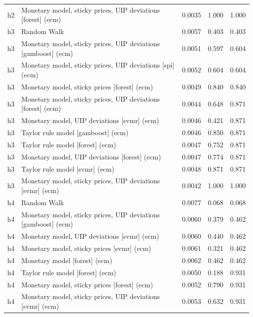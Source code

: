 \begin{ThreePartTable}
\begin{longtable}[t]{cp{5.5cm}ccc}
h2 & \raggedright Monetary model, sticky prices, UIP deviations [forest] (ecm) & 0.0035 & 1.000 & 1.000\\
\addlinespace
h3 & \raggedright Random Walk & 0.0057 & 0.403 & 0.403\\
h3 & \raggedright Monetary model, sticky prices, UIP deviations [gamboost] (ecm) & 0.0051 & 0.597 & 0.604\\
h3 & \raggedright Monetary model, sticky prices, UIP deviations [spi] (ecm) & 0.0052 & 0.604 & 0.604\\
h3 & \raggedright Monetary model, sticky prices [forest] (ecm) & 0.0049 & 0.840 & 0.840\\
h3 & \raggedright Monetary model, sticky prices, UIP deviations [forest] (ecm) & 0.0044 & 0.648 & 0.871\\
h3 & \raggedright Monetary model, UIP deviations [svmr] (ecm) & 0.0046 & 0.421 & 0.871\\
h3 & \raggedright Taylor rule model [gamboost] (ecm) & 0.0046 & 0.850 & 0.871\\
h3 & \raggedright Taylor rule model [forest] (ecm) & 0.0047 & 0.752 & 0.871\\
h3 & \raggedright Monetary model, UIP deviations [forest] (ecm) & 0.0047 & 0.774 & 0.871\\
h3 & \raggedright Taylor rule model [svmr] (ecm) & 0.0048 & 0.871 & 0.871\\
h3 & \raggedright Monetary model, sticky prices, UIP deviations [svmr] (ecm) & 0.0042 & 1.000 & 1.000\\
\addlinespace
h4 & \raggedright Random Walk & 0.0077 & 0.068 & 0.068\\
h4 & \raggedright Monetary model, sticky prices, UIP deviations [gamboost] (ecm) & 0.0060 & 0.379 & 0.462\\
h4 & \raggedright Monetary model, UIP deviations [svmr] (ecm) & 0.0060 & 0.440 & 0.462\\
h4 & \raggedright Monetary model, sticky prices [svmr] (ecm) & 0.0061 & 0.321 & 0.462\\
h4 & \raggedright Monetary model [forest] (ecm) & 0.0062 & 0.462 & 0.462\\
h4 & \raggedright Taylor rule model [forest] (ecm) & 0.0050 & 0.188 & 0.931\\
h4 & \raggedright Monetary model, sticky prices [forest] (ecm) & 0.0052 & 0.790 & 0.931\\
h4 & \raggedright Monetary model, sticky prices, UIP deviations [svmr] (ecm) & 0.0053 & 0.632 & 0.931\\

\end{longtable}
\end{ThreePartTable}
